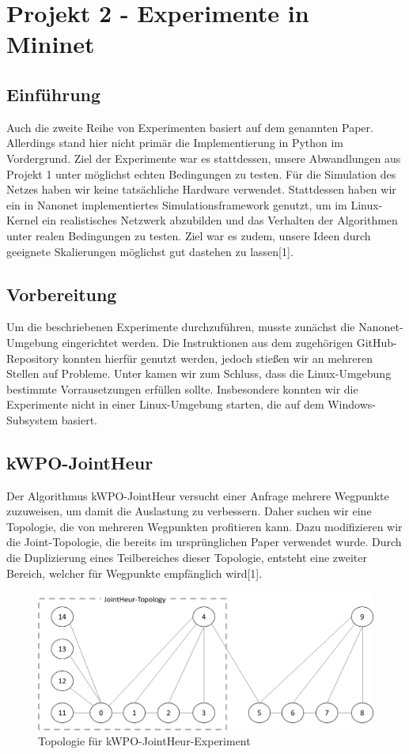 \documentclass[sigconf,noacm,review]{acmart}
\begin{document}
\section{Projekt 2 - Experimente in Mininet}
\subsection{Einführung}
Auch die zweite Reihe von Experimenten basiert auf dem genannten Paper. Allerdings stand hier nicht primär die Implementierung in Python im Vordergrund. Ziel der Experimente war es stattdessen,
unsere Abwandlungen aus Projekt 1 unter möglichst echten Bedingungen zu testen. Für die Simulation des Netzes haben wir keine tatsächliche Hardware verwendet.
Stattdessen haben wir ein in Nanonet implementiertes Simulationsframework genutzt, um im Linux-Kernel ein realistisches Netzwerk abzubilden und das Verhalten der Algorithmen unter realen Bedingungen zu testen. Ziel war es zudem, unsere Ideen durch geeignete Skalierungen möglichst gut dastehen zu lassen[1].

\subsection{Vorbereitung}
Um die beschriebenen Experimente durchzuführen, musste zunächst die Nanonet-Umgebung eingerichtet werden. Die Instruktionen aus dem zugehörigen GitHub-Repository konnten hierfür genutzt werden, jedoch stießen wir an mehreren Stellen auf Probleme. Unter kamen wir zum Schluss, dass die Linux-Umgebung bestimmte Vorrausetzungen erfüllen sollte. Insbesondere konnten wir die Experimente nicht in einer Linux-Umgebung starten, die auf dem Windows-Subsystem basiert.

\subsection{kWPO-JointHeur}
Der Algorithmus kWPO-JointHeur versucht einer Anfrage mehrere Wegpunkte zuzuweisen, um damit die Auslastung zu verbessern. Daher suchen wir eine Topologie, die von mehreren Wegpunkten profitieren kann. Dazu modifizieren wir die Joint-Topologie, die bereits im ursprünglichen Paper verwendet wurde. Durch die Duplizierung eines Teilbereiches dieser Topologie, entsteht eine zweiter Bereich, welcher für Wegpunkte empfänglich wird[1].
\begin{figure}[h]
  \centering
  \includegraphics[width=\linewidth]{abbildungen/kWPO_topo.png}
  \caption{Topologie für kWPO-JointHeur-Experiment}
\end{figure}
\end{document}
